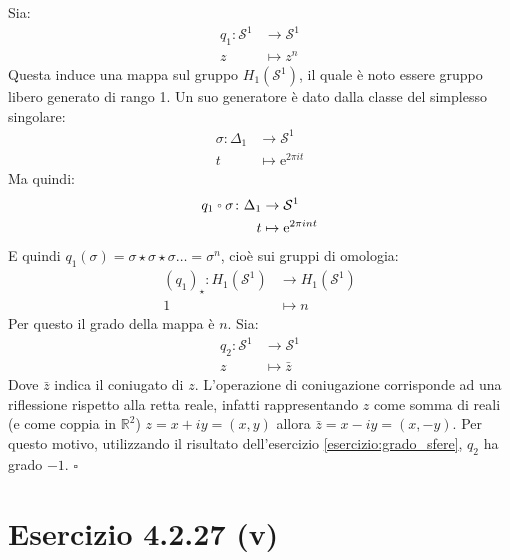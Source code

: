 \documentclass[10pt, toc=sectionentrywithdots]{scrartcl}
\newcommand{\Sph}[1][]{\mathcal{S}^#1}
\let\latexcirc=\circ
\newcommand{\ccirc}{\mathbin{\mathchoice
  {\xcirc\scriptstyle}
  {\xcirc\scriptstyle}
  {\xcirc\scriptscriptstyle}
  {\xcirc\scriptscriptstyle}
}}
\newcommand{\xcirc}[1]{\vcenter{\hbox{$#1\latexcirc$}}}
\let\circ\ccirc
\begin{document}
Sia:
\begin{align*}
  q_1 \colon  \Sph{1} &\to \Sph{1} \\
  z & \mapsto z^n
\end{align*}
Questa induce una mappa sul gruppo $ H_1(\Sph{1}) $,
il quale è noto essere gruppo libero generato di rango 1.
Un suo generatore è dato dalla classe del simplesso
singolare:
\begin{align*}
  \sigma \colon \Delta_1 & \to \Sph{1} \\
  t & \mapsto \mathrm{e}^{2 \pi i t}
\end{align*}
Ma quindi:
\begin{align*}
  q_1 \circ \sigma \colon \Delta_1 & \to \Sph{1} \\
  t & \mapsto \mathrm{e}^{2 \pi i n t}
\end{align*}
E quindi $ q_1(\sigma) = \sigma \star \sigma \star \sigma \dots = \sigma^n $, cioè sui gruppi
di omologia:
\begin{align*}
  (q_1)_\star \colon H_1(\Sph{1}) & \to H_1(\Sph{1}) \\
  1 & \mapsto n
\end{align*}
Per questo il grado della mappa è $ n $.
Sia:
\begin{align*}
  q_2 \colon  \Sph{1} & \to \Sph{1} \\
  z & \mapsto \bar{z}
\end{align*}
Dove $ \bar{z} $ indica il coniugato di $ z $. L'operazione di coniugazione
corrisponde ad una riflessione rispetto alla retta reale, infatti rappresentando
$ z $ come somma di reali (e come coppia in $ \mathbb{R}^{2} $) $ z = x + i y = (x, y) $
allora $ \bar{z} = x - i y = (x, -y) $. Per questo motivo,
utilizzando il risultato dell'esercizio \ref{esercizio:grado_sfere}, $ q_2 $ ha grado
$ -1 $.
\hfill $ \square $

\section[4.2.27 (v)]{Esercizio 4.2.27 (v)}
\end{document}
